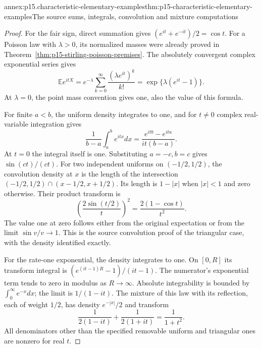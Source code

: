 \begin{annexitem}{annex:p15.characteristic-elementary-examples}{thm:p15-characteristic-elementary-examples}{The source sums, integrals, convolution and mixture computations}
\begin{proof}
For the fair sign, direct summation gives
\((e^{it}+e^{-it})/2=\cos t\).
For a Poisson law with \(\lambda>0\), its normalized
masses were already proved in
Theorem~\ref{thm:p15-stirling-poisson-premises}.
The absolutely convergent complex exponential series gives
\[
 \mathbb E e^{itX}
 =e^{-\lambda}\sum_{k=0}^\infty
                 \frac{(\lambda e^{it})^k}{k!}
 =\exp\{\lambda(e^{it}-1)\}.
\]
At \(\lambda=0\), the point mass convention gives one,
also the value of this formula.

For finite \(a<b\), the uniform density integrates to
one, and for \(t\ne0\) complex real-variable integration gives
\[
 \frac1{b-a}\int_a^b e^{itx}dx
                   =\frac{e^{itb}-e^{ita}}{it(b-a)}.
\]
At \(t=0\) the integral itself is one.
Substituting \(a=-c,b=c\) gives \(\sin(ct)/(ct)\).
For two independent uniforms on \((-1/2,1/2)\), the
convolution density at \(x\) is the length of the
intersection
\((-1/2,1/2)\cap(x-1/2,x+1/2)\).
Its length is \(1-|x|\) when \(|x|<1\) and zero
otherwise. Their product transform is
\[
 \left(\frac{2\sin(t/2)}t\right)^2
                       =\frac{2(1-\cos t)}{t^2}.
\]
The value one at zero follows either from the original
expectation or from the limit \(\sin v/v\to1\).
This is the source convolution proof of the triangular
case, with the density identified exactly.

For the rate-one exponential, the density integrates
to one. On \([0,R]\) its transform integral is
\((e^{(it-1)R}-1)/(it-1)\). The numerator's exponential
term tends to zero in modulus as \(R\to\infty\).
Absolute integrability is bounded by \(\int_0^\infty e^{-x}dx\);
the limit is \(1/(1-it)\).
The mixture of this law with its reflection, each
of weight \(1/2\), has density \(e^{-|x|}/2\) and transform
\[
 \frac1{2(1-it)}+\frac1{2(1+it)}=\frac1{1+t^2}.
\]
All denominators other than the specified removable
uniform and triangular ones are nonzero for real \(t\).
\end{proof}
\end{annexitem}


